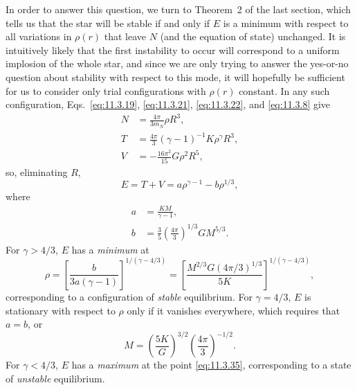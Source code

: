 In order to answer this question, we turn to Theorem~2 of the last section,
which tells us that the star will be stable if and only if \(E\) is a minimum
with respect to all variations in \(\rho(r)\) that leave \(N\) (and the
equation of state) unchanged. It is intuitively likely that the first
instability to occur will correspond to a uniform implosion of the whole star,
and since we are only trying to answer the yes-or-no question about stability
with respect to this mode, it will hopefully be sufficient for us to consider
only trial configurations with \(\rho(r)\) constant. In any such
configuration, Eqs.~\eqref{eq:11.3.19}, \eqref{eq:11.3.21},
\eqref{eq:11.3.22}, and \eqref{eq:11.3.8} give
\begin{align}
  N&=\frac{4\pi}{3m_N}\rho R^3,
  \tag{11.3.29}\label{eq:11.3.29}\\
  T&=\frac{4\pi}{3}(\gamma-1)^{-1}K\rho^\gamma R^3,
  \tag{11.3.30}\label{eq:11.3.30}\\
  V&=-\frac{16\pi^2}{15}G\rho^2R^5,
  \tag{11.3.31}\label{eq:11.3.31}
\end{align}
so, eliminating \(R\),
\begin{equation}
  E=T+V=a\rho^{\gamma-1}-b\rho^{1/3},
  \tag{11.3.32}\label{eq:11.3.32}
\end{equation}
where
\begin{align}
  a&=\frac{KM}{\gamma-1},
  \tag{11.3.33}\label{eq:11.3.33}\\
  b&=\frac35\left(\frac{4\pi}{3}\right)^{1/3}GM^{5/3}.
  \tag{11.3.34}\label{eq:11.3.34}
\end{align}
For \(\gamma>4/3\), \(E\) has a \emph{minimum} at
\begin{equation}
  \rho
  =
  \left[\frac{b}{3a(\gamma-1)}\right]^{1/(\gamma-4/3)}
  =
  \left[
    \frac{M^{2/3}G(4\pi/3)^{1/3}}{5K}
  \right]^{1/(\gamma-4/3)},
  \tag{11.3.35}\label{eq:11.3.35}
\end{equation}
corresponding to a configuration of \emph{stable} equilibrium. For
\(\gamma=4/3\), \(E\) is stationary with respect to \(\rho\) only if it
vanishes everywhere, which requires that \(a=b\), or
\begin{equation}
  M
  =
  \left(\frac{5K}{G}\right)^{3/2}
  \left(\frac{4\pi}{3}\right)^{-1/2}.
  \tag{11.3.36}\label{eq:11.3.36}
\end{equation}
For \(\gamma<4/3\), \(E\) has a \emph{maximum} at the point
\eqref{eq:11.3.35}, corresponding to a state of \emph{unstable} equilibrium.


